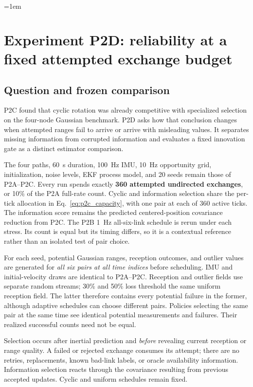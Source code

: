 \begingroup
\emergencystretch=1em
\section{Experiment P2D: reliability at a fixed attempted exchange budget}
\label{sec:p2d}
\subsection{Question and frozen comparison}
P2C found that cyclic rotation was already competitive with specialized selection on the four-node Gaussian benchmark. P2D asks how that conclusion changes when attempted ranges fail to arrive or arrive with misleading values. It separates missing information from corrupted information and evaluates a fixed innovation gate as a distinct estimator comparison.

The four paths, \SI{60}{s} duration, \SI{100}{Hz} IMU, \SI{10}{Hz} opportunity grid, initialization, noise levels, EKF process model, and 20 seeds remain those of P2A--P2C. Every run spends exactly \textbf{360 attempted undirected exchanges}, or 10\% of the P2A full-rate count. Cyclic and information selection share the per-tick allocation in Eq.~\ref{eq:p2c_capacity}, with one pair at each of 360 active ticks. The information score remains the predicted centered-position covariance reduction from P2C. The P2B \SI{1}{Hz} all-six-link schedule is rerun under each stress. Its count is equal but its timing differs, so it is a contextual reference rather than an isolated test of pair choice.

For each seed, potential Gaussian ranges, reception outcomes, and outlier values are generated for \emph{all six pairs at all time indices} before scheduling. IMU and initial-velocity draws are identical to P2A--P2C. Reception and outlier fields use separate random streams; 30\% and 50\% loss threshold the same uniform reception field. The latter therefore contains every potential failure in the former, although adaptive schedules can choose different pairs. Policies selecting the same pair at the same time see identical potential measurements and failures. Their realized successful counts need not be equal.

Selection occurs after inertial prediction and \emph{before} revealing current reception or range quality. A failed or rejected exchange consumes its attempt; there are no retries, replacements, known bad-link labels, or oracle availability information. Information selection reacts through the covariance resulting from previous accepted updates. Cyclic and uniform schedules remain fixed.

